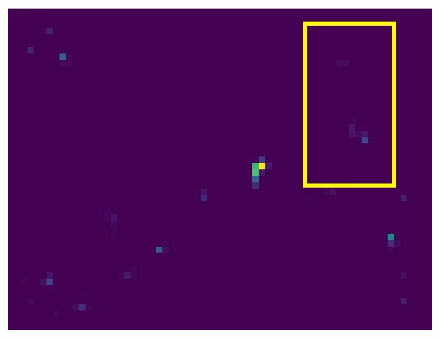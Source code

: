 \begin{figure}[h!]
{\begin{minipage}[t]{3.5cm}
		\end{minipage}
		\begin{minipage}[t]{3.5cm}
			\centering
			\includegraphics[width=0.9\linewidth]{figures/pixel/map4_3}
	\end{minipage}}
	

\end{figure}
